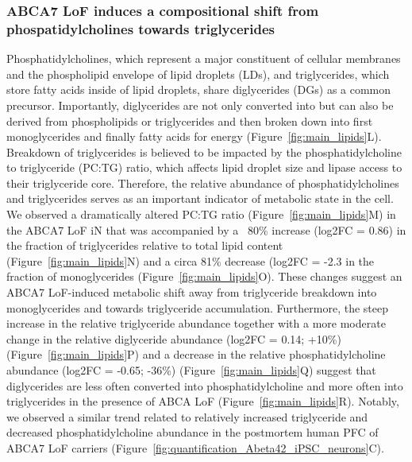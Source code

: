 \subsubsection{ABCA7 LoF induces a compositional shift from phospatidylcholines towards triglycerides}
Phosphatidylcholines, which represent a major constituent of cellular membranes and the phospholipid envelope of lipid droplets (LDs), and triglycerides, which store fatty acids inside of lipid droplets, share diglycerides (DGs) as a common precursor\cite{Tomioka2017-nv,Picataggi2022-yp}. Importantly, diglycerides are not only converted into but can also be derived from phospholipids or triglycerides and then broken down into first monoglycerides and finally fatty acids for energy (Figure~\ref{fig:main_lipids}L). Breakdown of triglycerides is believed to be impacted by the phosphatidylcholine to triglyceride (PC:TG) ratio, which affects lipid droplet size and lipase access to their triglyceride core\cite{Krahmer2011-xy,Guo2008-xt,Fei2011-bl,Schott2019-zq}. Therefore, the relative abundance of phosphatidylcholines and triglycerides serves as an important indicator of metabolic state in the cell. We observed a dramatically altered PC:TG ratio (Figure~\ref{fig:main_lipids}M) in the ABCA7 LoF iN that was accompanied by a ~80\% increase (log2FC = 0.86) in the fraction of triglycerides relative to total lipid content (Figure~\ref{fig:main_lipids}N) and a circa 81\% decrease (log2FC = -2.3 in the fraction of monoglycerides (Figure~\ref{fig:main_lipids}O). These changes suggest an ABCA7 LoF-induced metabolic shift away from triglyceride breakdown into monoglycerides and towards triglyceride accumulation. Furthermore, the steep increase in the relative triglyceride abundance together with a more moderate change in the relative diglyceride abundance (log2FC = 0.14; +10\%) (Figure~\ref{fig:main_lipids}P) and a decrease in the relative phosphatidylcholine abundance (log2FC = -0.65; -36\%) (Figure~\ref{fig:main_lipids}Q) suggest that diglycerides are less often converted into phosphatidylcholine and more often into triglycerides in the presence of ABCA LoF (Figure~\ref{fig:main_lipids}R). Notably, we observed a similar trend related to relatively increased triglyceride and decreased phosphatidylcholine abundance in the postmortem human PFC of ABCA7 LoF carriers (Figure~\ref{fig:quantification_Abeta42_iPSC_neurons}C). 

